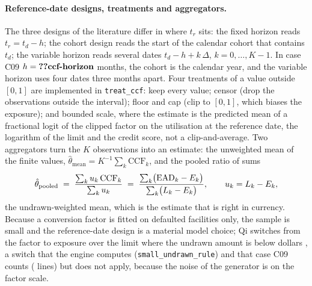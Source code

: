 \paragraph{Reference-date designs, treatments and aggregators.} The three designs of the literature \citep{lgd-ead:moral2006} differ in where $t_r$ sits: the fixed horizon reads $t_r=t_d-h$; the cohort design reads the start of the calendar cohort that contains $t_d$; the variable horizon reads several dates $t_d-h+k\,\Delta$, $k=0,\dots,K-1$. In case C09 $h=\LE{ccf-horizon}$ months, the cohort is the calendar year, and the variable horizon uses four dates three months apart. Four treatments of a value outside $[0,1]$ are implemented in \texttt{treat\_ccf}: keep every value; censor (drop the observations outside the interval); floor and cap (clip to $[0,1]$, which biases the exposure); and bounded scale, where the estimate is the predicted mean of a fractional logit of the clipped factor on the utilisation at the reference date, the logarithm of the limit and the credit score, not a clip-and-average. Two aggregators turn the $K$ observations into an estimate: the unweighted mean of the finite values, $\hat\theta_{\mathrm{mean}}=K^{-1}\sum_k\mathrm{CCF}_k$, and the pooled ratio of sums
\begin{equation}
\hat\theta_{\mathrm{pooled}}\;=\;\frac{\sum_k u_k\,\mathrm{CCF}_k}{\sum_k u_k}\;=\;\frac{\sum_k\bigl(\mathrm{EAD}_k-E_k\bigr)}{\sum_k\bigl(L_k-E_k\bigr)},\qquad u_k=L_k-E_k,
\label{eq:lgd-ead-pooled}
\end{equation}
the undrawn-weighted mean, which is the estimate that is right in currency. Because a conversion factor is fitted on defaulted facilities only, the sample is small and the reference-date design is a material model choice; Qi switches from the factor to exposure over the limit where the undrawn amount is below  dollars \citep{lgd-ead:qi2009}, a switch that the engine computes (\texttt{small\_undrawn\_rule}) and that case C09 counts ( lines) but does not apply, because the noise of the generator is on the factor scale.

